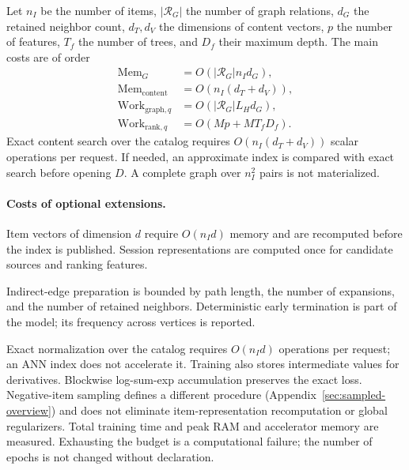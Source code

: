 \documentclass[12pt,a4paper]{article}
\theoremstyle{plainru}
\begin{document}
Let \(n_I\) be the number of items, \(|\mathcal R_G|\) the number of graph relations,
\(d_G\) the retained neighbor count, \(d_T,d_V\) the dimensions of
content vectors, \(p\) the number of features, \(T_f\) the number of trees,
and \(D_f\) their maximum depth. The main costs are of order
\begin{align}
\mathrm{Mem}_{G}&=O(|\mathcal R_G|n_Id_G),\label{eq:ops-graph-memory}\\
\mathrm{Mem}_{\mathrm{content}}&=O(n_I(d_T+d_V)),\label{eq:ops-content-memory}\\
\mathrm{Work}_{\mathrm{graph},q}&=O(|\mathcal R_G|L_Hd_G),\label{eq:ops-graph-work}\\
\mathrm{Work}_{\mathrm{rank},q}&=O(Mp+MT_fD_f).\label{eq:ops-rank-work}
\end{align}
Exact content search over the catalog requires
\(O(n_I(d_T+d_V))\) scalar operations per request.
If needed, an approximate index is compared with exact search
before opening $D$. A complete graph over \(n_I^2\) pairs is not materialized.

\paragraph{Costs of optional extensions.}
Item vectors of dimension $d$ require $O(n_Id)$ memory
and are recomputed before the index is published. Session representations
are computed once for candidate sources and ranking features.

Indirect-edge preparation is bounded by path length, the number of expansions,
and the number of retained neighbors. Deterministic early termination
is part of the model; its frequency across vertices is reported.

Exact normalization over the catalog requires $O(n_Id)$ operations per request;
an ANN index does not accelerate it. Training also stores intermediate values
for derivatives. Blockwise log-sum-exp accumulation preserves
the exact loss. Negative-item sampling defines a different procedure
(Appendix~\ref{sec:sampled-overview}) and does not eliminate item-representation
recomputation or global regularizers.
Total training time and peak RAM and accelerator memory are measured.
Exhausting the budget is a computational failure;
the number of epochs is not changed without declaration.
\end{document}
